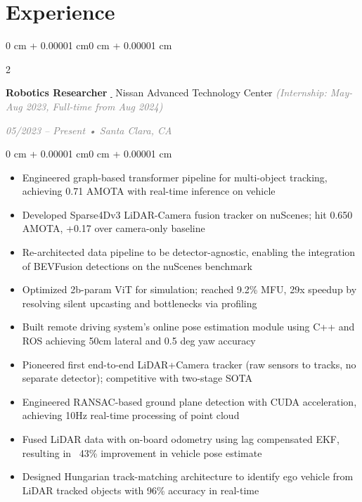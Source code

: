 \documentclass[10pt, a4paper]{article}
\newcommand{\externallink}[2]{\href{#1}{#2\,{\footnotesize\textcolor{gray}{\faLink}}}}
\newcommand{\customsection}[1]{%
    \section*{%
        \textbf{%
            \fontsize{11pt}{11pt}\selectfont
            \color{Blue}#1%
        }%
        \hspace{0.5em}\color{Blue}\hrulefill%
    }%
    \vspace{0.03cm}%
}
\newenvironment{highlights}{
    \begingroup
    \fontsize{9.3pt}{10.8pt}\selectfont
    \begin{itemize}[
        topsep=0.03cm,
        parsep=0.03cm,
        partopsep=0pt,
        itemsep=0pt,
        leftmargin=0cm + 8pt
    ]
}{
    \end{itemize}
    \endgroup
}
\newenvironment{onecolentry}{
    \begin{adjustwidth}{0 cm + 0.00001 cm}{0 cm + 0.00001 cm}
}{
    \end{adjustwidth}
}
\newenvironment{twocolentry}[2][]{
    \onecolentry
    \def\secondColumn{#2}
    \setcolumnwidth{\fill, 6.0 cm}
    \begin{paracol}{2}
}{
    \switchcolumn \raggedleft \secondColumn
    \end{paracol}
    \endonecolentry
}
\begin{document}
\customsection{Experience}

\begin{twocolentry}{
    {\small\textcolor{gray}{\textit{05/2023 – Present • Santa Clara, CA}}}
}
    \textbf{Robotics Researcher} \externallink{https://www.nissan-global.com/EN/INNOVATION/TECHNOLOGY/ADVANCED_TECH_CENTER/}{}\newline
    {\small Nissan Advanced Technology Center } {\small\textcolor{gray}{\textit{(Internship: May-Aug 2023, Full-time from Aug 2024)}}}
\end{twocolentry}
\vspace{0.1cm}

\begin{onecolentry}
    \begin{highlights}
        \item Engineered graph-based transformer pipeline for multi-object tracking, achieving 0.71 AMOTA with real-time inference on vehicle
        \item Developed Sparse4Dv3 LiDAR-Camera fusion tracker on nuScenes; hit 0.650 AMOTA, +0.17 over camera-only baseline
        \item Re-architected data pipeline to be detector-agnostic, enabling the integration of BEVFusion detections on the nuScenes benchmark
        \item Optimized 2b-param ViT for simulation; reached 9.2\% MFU, 29x speedup by resolving silent upcasting and bottlenecks via profiling
        \item Built remote driving system's online pose estimation module using C++ and ROS achieving 50cm lateral and 0.5 deg yaw accuracy
        \item Pioneered first end-to-end LiDAR+Camera tracker (raw sensors to tracks, no separate detector); competitive with two-stage SOTA
        \item Engineered RANSAC-based ground plane detection with CUDA acceleration, achieving 10Hz real-time processing of point cloud
        \item Fused LiDAR data with on-board odometry using lag compensated EKF, resulting in ~43\% improvement in vehicle pose estimate
        \item Designed Hungarian track-matching architecture to identify ego vehicle from LiDAR tracked objects with 96\% accuracy in real-time
    \end{highlights}
\end{onecolentry}
\vspace{0.15cm}
\end{document}
